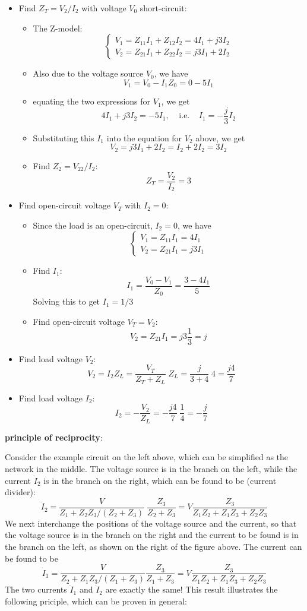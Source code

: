 \begin{itemize}
\item Find $Z_T=V_2/I_2$ with voltage $V_0$ short-circuit:
  \begin{itemize}
  \item The Z-model:
    \[ \left\{ \begin{array}{l} V_1=Z_{11}I_1+Z_{12}I_2=4I_1+j3I_2	\\
      V_2=Z_{21}I_1+Z_{22}I_2=j3I_1+2I_2 \end{array} \right. \]
  \item Also due to the voltage source $V_0$, we have
    \[ V_1=V_0-I_1 Z_0=0-5I_1	\]
  \item equating the two expressions for $V_1$, we get
    \[ 4I_1+j3I_2=-5I_1,\;\;\;\;\mbox{i.e.}\;\;\;\;I_1=-\frac{j}{3} I_2	\]
  \item Substituting this $I_1$ into the equation for $V_2$ above, we get
    \[ V_2=j3I_1+2I_2=I_2+2I_2=3I_2 \]
  \item Find $Z_2=V_22/I_2$:
    \[ Z_T=\frac{V_2}{I_2}=3	\]
  \end{itemize}
\item Find open-circuit voltage $V_T$ with $I_2=0$:
  \begin{itemize}
  \item Since the load is an open-circuit, $I_2=0$, we have
    \[ \left\{ \begin{array}{l} V_1=Z_{11}I_1=4I_1 \\
      V_2=Z_{21}I_1=j3 I_1 \end{array} \right. \]
    \item Find $I_1$:
      \[	I_1=\frac{V_0-V_1}{Z_0}=\frac{3-4I_1}{5}	\]
      Solving this to get $I_1=1/3$
    \item Find open-circuit voltage $V_T=V_2$:
      \[	V_2=Z_{21}I_1=j3 \frac{1}{3}=j	\]
  \end{itemize}
\item Find load voltage $V_2$:
  \[ V_2=I_2 Z_L=\frac{V_T}{Z_T+Z_L}\;Z_L=\frac{j}{3+4}\;4=\frac{j4}{7} \]
\item Find load voltage $I_2$:
  \[ I_2=-\frac{V_2}{Z_L}=-\frac{j4}{7}\;\frac{1}{4}=-\frac{j}{7} \]
\end{itemize}


{\bf principle of reciprocity}:
 

Consider the example circuit on the left above, which can be simplified 
as the network in the middle. The voltage source is in the branch on the
left, while the current $\dot{I}_2$ is in the branch on the right, which
can be found to be (current divider):
\[ \dot{I}_2=\frac{V}{Z_1+Z_2 Z_3/(Z_2+Z_3)}\;\frac{Z_3}{Z_2+Z_3}
=V \frac{Z_3}{Z_1Z_2+Z_1Z_3+Z_2Z_3} \]
We next interchange the positions of the voltage source and the current, 
so that the voltage source is in the branch on the right and the current 
to be found is in the branch on the left, as shown on the right of the 
figure above. The current can be found to be
\[ \dot{I}_1=\frac{V}{Z_2+Z_1 Z_3/(Z_1+Z_3)}\frac{Z_3}{Z_1+Z_3}
=V \frac{Z_3}{Z_1Z_2+Z_1Z_3+Z_2Z_3} \]
The two currents $\dot{I}_1$ and $\dot{I}_2$ are exactly the same! This
result illustrates the following priciple, which can be proven in general:

